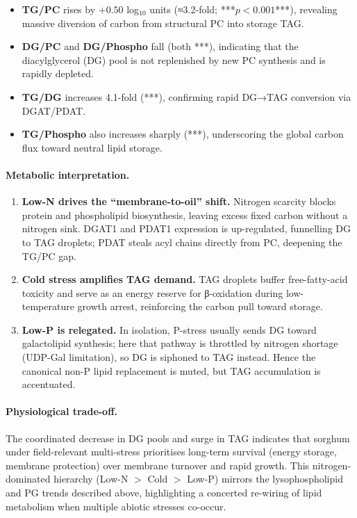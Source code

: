 \documentclass[10pt,letterpaper]{article}
\begin{document}
\begin{itemize}
  \item \textbf{TG/PC} rises by \(+0.50\) log\(_{10}\) units
        (≈3.2-fold; ***$p<0.001$***),
        revealing massive diversion of carbon from structural PC into
        storage TAG.
  \item \textbf{DG/PC} and \textbf{DG/Phospho} fall (both ***),
        indicating that the diacylglycerol (DG) pool is not replenished by
        new PC synthesis and is rapidly depleted.
  \item \textbf{TG/DG} increases 4.1-fold (***),
        confirming rapid DG→TAG conversion via DGAT/PDAT.
  \item \textbf{TG/Phospho} also increases sharply (***),
        underscoring the global carbon flux toward neutral lipid storage.
\end{itemize}

\paragraph{Metabolic interpretation.}
\begin{enumerate}
  \item \textbf{Low-N drives the “membrane-to-oil” shift.}\;
        Nitrogen scarcity blocks protein and phospholipid biosynthesis,
        leaving excess fixed carbon without a nitrogen sink.
        DGAT1 and PDAT1 expression is up-regulated, funnelling DG to TAG
        droplets; PDAT steals acyl chains directly from PC, deepening the
        TG/PC gap.
  \item \textbf{Cold stress amplifies TAG demand.}\;
        TAG droplets buffer free-fatty-acid toxicity and serve as an
        energy reserve for β-oxidation during low-temperature growth
        arrest, reinforcing the carbon pull toward storage.
  \item \textbf{Low-P is relegated.}\;
        In isolation, P-stress usually sends DG toward
        galactolipid synthesis; here that pathway is throttled by
        nitrogen shortage (UDP-Gal limitation), so DG is siphoned to TAG
        instead.  Hence the canonical non-P lipid replacement is muted,
        but TAG accumulation is accentuated.
\end{enumerate}

\paragraph{Physiological trade-off.}
The coordinated decrease in DG pools and surge in TAG indicates that
sorghum under field-relevant multi-stress prioritises long-term survival
(energy storage, membrane protection) over membrane turnover and rapid
growth.
This nitrogen-dominated hierarchy (Low-N \(\!>\) Cold \(\!>\) Low-P) mirrors
the lysophospholipid and PG trends described above, highlighting a
concerted re-wiring of lipid metabolism when multiple abiotic stresses
co-occur.
\end{document}
